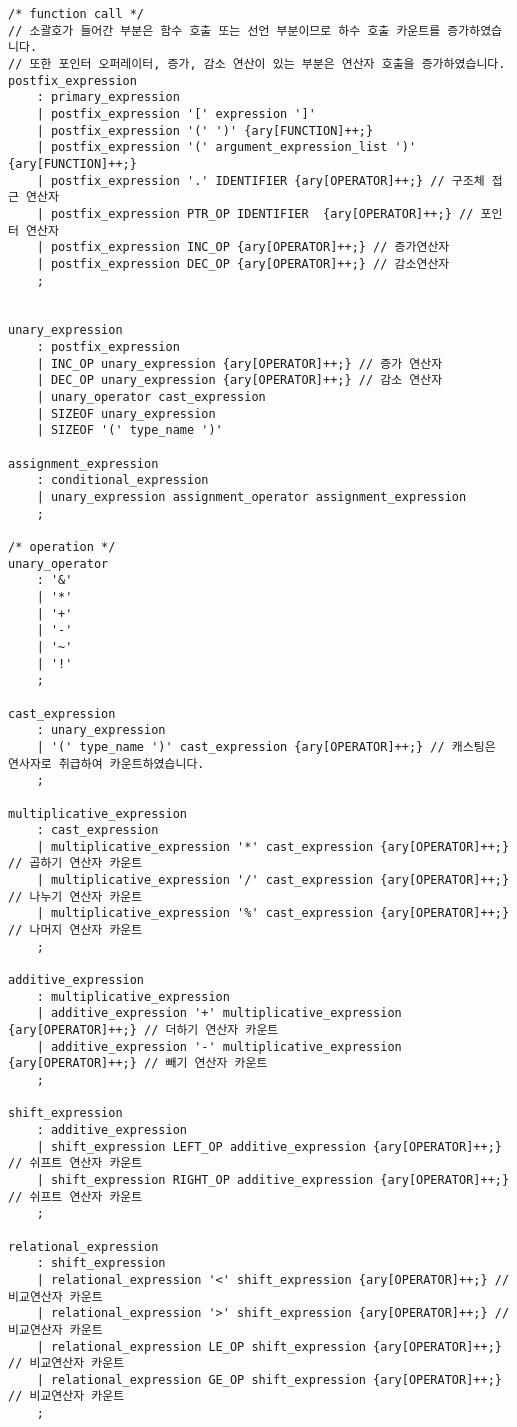 \documentclass[11pt,oneside,a4paper]{article}
\begin{document}
\begin{verbatim}
/* function call */
// 소괄호가 들어간 부분은 함수 호출 또는 선언 부분이므로 하수 호출 카운트를 증가하였습니다.
// 또한 포인터 오퍼레이터, 증가, 감소 연산이 있는 부분은 연산자 호출을 증가하였습니다.
postfix_expression
	: primary_expression
	| postfix_expression '[' expression ']'
	| postfix_expression '(' ')' {ary[FUNCTION]++;} 
	| postfix_expression '(' argument_expression_list ')' {ary[FUNCTION]++;}
	| postfix_expression '.' IDENTIFIER {ary[OPERATOR]++;} // 구조체 접근 연산자
	| postfix_expression PTR_OP IDENTIFIER  {ary[OPERATOR]++;} // 포인터 연산자
	| postfix_expression INC_OP {ary[OPERATOR]++;} // 증가연산자
	| postfix_expression DEC_OP {ary[OPERATOR]++;} // 감소연산자
	;


unary_expression
	: postfix_expression
	| INC_OP unary_expression {ary[OPERATOR]++;} // 증가 연산자
	| DEC_OP unary_expression {ary[OPERATOR]++;} // 감소 연산자
	| unary_operator cast_expression
	| SIZEOF unary_expression
	| SIZEOF '(' type_name ')'

assignment_expression
	: conditional_expression
	| unary_expression assignment_operator assignment_expression
	;

/* operation */
unary_operator
	: '&' 
	| '*' 
	| '+' 
	| '-' 
	| '~' 
	| '!' 
	;

cast_expression
	: unary_expression
	| '(' type_name ')' cast_expression {ary[OPERATOR]++;} // 캐스팅은 연사자로 취급하여 카운트하였습니다.
	;

multiplicative_expression
	: cast_expression
	| multiplicative_expression '*' cast_expression {ary[OPERATOR]++;} // 곱하기 연산자 카운트
	| multiplicative_expression '/' cast_expression {ary[OPERATOR]++;} // 나누기 연산자 카운트
	| multiplicative_expression '%' cast_expression {ary[OPERATOR]++;} // 나머지 연산자 카운트
	;

additive_expression
	: multiplicative_expression
	| additive_expression '+' multiplicative_expression {ary[OPERATOR]++;} // 더하기 연산자 카운트
	| additive_expression '-' multiplicative_expression {ary[OPERATOR]++;} // 빼기 연산자 카운트
	;

shift_expression
	: additive_expression
	| shift_expression LEFT_OP additive_expression {ary[OPERATOR]++;} // 쉬프트 연산자 카운트
	| shift_expression RIGHT_OP additive_expression {ary[OPERATOR]++;} // 쉬프트 연산자 카운트
	;

relational_expression
	: shift_expression
	| relational_expression '<' shift_expression {ary[OPERATOR]++;} // 비교연산자 카운트
	| relational_expression '>' shift_expression {ary[OPERATOR]++;} // 비교연산자 카운트
	| relational_expression LE_OP shift_expression {ary[OPERATOR]++;} // 비교연산자 카운트
	| relational_expression GE_OP shift_expression {ary[OPERATOR]++;} // 비교연산자 카운트
	;


\end{verbatim}
\end{document}
